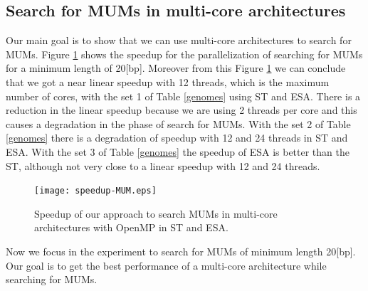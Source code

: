 \documentclass[runningheads,a4paper]{llncs}
\begin{document}
 \subsection{Search for MUMs in multi-core architectures}
Our main goal is to show that we can use multi-core architectures to search for MUMs. Figure \ref{fig:speedup} shows the speedup for the parallelization of searching for MUMs for a minimum length of 20[bp]. Moreover from this Figure \ref{fig:speedup} we can conclude that we got a near linear speedup with 12 threads, which is the maximum number of cores, with the set 1 of Table \ref{genomes} using ST and ESA.  There is a reduction in the linear speedup because we are using 2 threads per core and this causes a degradation in the phase of search for MUMs. With the set 2 of Table \ref{genomes} there is a degradation of speedup with 12 and 24 threads in ST and ESA. With the set 3 of Table \ref{genomes} the speedup of ESA is better than the ST, although not very close to a linear speedup with 12 and 24 threads.
\begin{figure}[h]
  \centering
   \texttt{[image: speedup-MUM.eps]}
  \caption{Speedup of our approach to search MUMs in multi-core architectures with OpenMP in ST and ESA.}
  \label{fig:speedup}
\end{figure}  
Now we focus in the experiment to search for MUMs of minimum length 20[bp]. Our goal is to get the best performance of a multi-core architecture while searching for MUMs.
\end{document}
